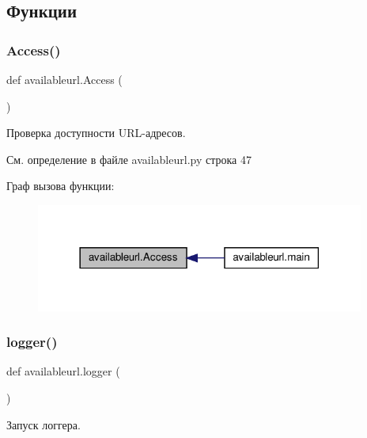 \subsection{Функции}
\mbox{\label{namespaceavailableurl_aff3d4545f3483782a407aab7859602f4}} 
\subsubsection{\texorpdfstring{Access()}{Access()}}
{\footnotesize\ttfamily def availableurl.\+Access (\begin{DoxyParamCaption}{ }\end{DoxyParamCaption})}



Проверка доступности U\+R\+L-\/адресов. 



См. определение в файле availableurl.\+py строка 47

Граф вызова функции\+:\nopagebreak
\begin{figure}[H]
\begin{center}
\leavevmode
\includegraphics[width=306pt]{namespaceavailableurl_aff3d4545f3483782a407aab7859602f4_icgraph}
\end{center}
\end{figure}
\mbox{\label{namespaceavailableurl_a25d6c72ce2cd54a5490720f1319c68dc}} 
\subsubsection{\texorpdfstring{logger()}{logger()}}
{\footnotesize\ttfamily def availableurl.\+logger (\begin{DoxyParamCaption}{ }\end{DoxyParamCaption})}



Запуск логгера. 



